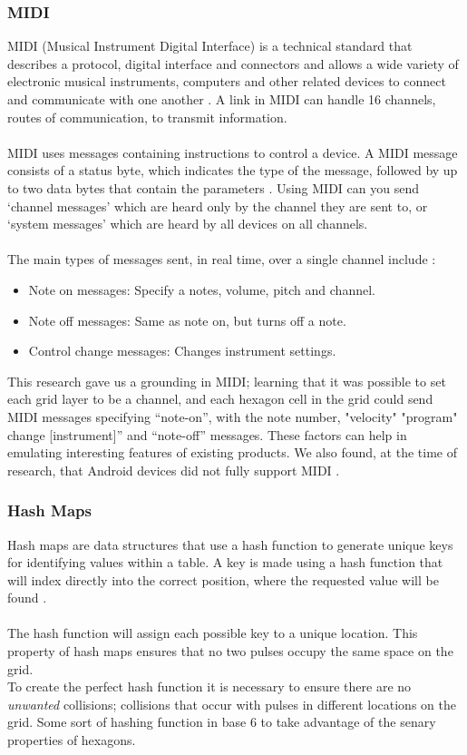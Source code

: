 \documentclass[10pt,a4paper]{article}
\begin{document}
\subsubsection{MIDI}
MIDI (Musical Instrument Digital Interface) is a technical standard that describes a protocol, digital interface and connectors and allows a wide variety of electronic musical instruments, computers and other related devices to connect and communicate with one another \cite{swift}. A link in MIDI can handle 16 channels, routes of communication, to transmit information.\\
\\
MIDI uses messages containing instructions to control a device. A MIDI message consists of a status byte, which indicates the type of the message, followed by up to two data bytes that contain the parameters \cite{brewster}. Using MIDI can you send ‘channel messages’ which are heard only by the channel they are sent to, or ‘system messages’ which are heard by all devices on all channels.\\
\\
The main types of messages sent, in real time, over a single channel include \cite{Huber}:
\begin{itemize}
\item Note on messages: Specify a notes, volume, pitch and channel.
\item Note off messages: Same as note on, but turns off a note.
\item Control change messages: Changes instrument settings.
\end{itemize}
This research gave us a grounding in MIDI; learning that it was possible to set each grid layer to be a channel, and each hexagon cell in the grid could send MIDI messages specifying “note-on”, with the note number, "velocity" "program" change [instrument]” and “note-off” messages. These factors can help in emulating interesting features of existing products. We also found, at the time of research, that Android devices did not fully support MIDI \cite{midinope}. 

\subsubsection{Hash Maps}
Hash maps are data structures that use a hash function to generate unique keys for identifying values within a table. A key is made using a hash function that will index directly into the correct position, where the requested value will be found \cite{hashm}.\\
\\
The hash function will assign each possible key to a unique location. This property of hash maps ensures that no two pulses occupy the same space on the grid.
\\
To create the perfect hash function it is necessary to ensure there are no \textit{unwanted} collisions; collisions that occur with pulses in different locations on the grid. Some sort of hashing function in base 6 to take advantage of the senary properties of hexagons.\\
\end{document}
